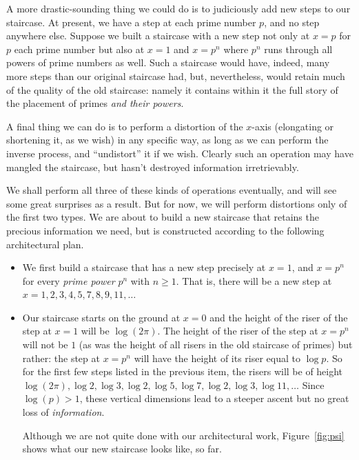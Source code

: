 \documentclass[openany]{book}
\theoremstyle{plain}
\theoremstyle{definition}
\begin{document}
{A more drastic-sounding thing we could do is to judiciously add new
steps to our staircase. At present, we have a step at each prime
number $p$, and no step anywhere else. Suppose we built a staircase
with a new step not only at $x=p$ for $p$ each prime number but also at
$x =1$ and $x=p^n$ where $p^n$ runs through all powers of prime numbers as
well. Such a staircase would have, indeed, many more steps than our
original staircase had, but, nevertheless, would retain much of the
quality of the old staircase: namely it contains within it the full
story of the placement of primes {\em and their powers}.

A final thing we can do is to perform a distortion of the $x$-axis
(elongating or shortening it, as we wish) in any specific way, as long
as we can perform the inverse process, and ``undistort'' it if we wish.
Clearly such an operation may have mangled the staircase, but hasn't destroyed
information irretrievably.

We shall perform all three of these kinds of operations eventually,
and will see some great surprises as a result.  But for now, we will
perform distortions only of the first two types.  We are about to
build a new staircase that retains the precious information we need,
but is constructed according to the following architectural plan.

 \begin{itemize}

 \item We first build a staircase that has a new step precisely at $x
   =1$, and $ x= p^n$ for every {\em prime power} $p^n$ with $n\geq
   1$. That is, there will be a new step at $x= 1,2,3,4,5,7,8,9,11,
   \dots$

 \item Our staircase starts on the ground at $x=0$ and the height of the
   riser of the step at $x=1$ will be $\log(2\pi)$. The height of the
   riser of the step at $x=p^n$ will not be $1$
   (as was the height of all risers in the old staircase of primes)
   but rather: the step at $x=p^n$ will have the height of its riser
   equal to $\log p$.  So for the first few steps listed in the
   previous item, the risers will be of height $\log(2\pi), \log
   2,\log 3,\log 2,\log 5,\log 7, \log 2,\log 3,\log 11, \dots$
   Since $\log(p)>1$,
  these vertical dimensions lead to a steeper ascent but no great loss
  of {\em information}.

   Although we are not quite done with our architectural work, Figure~\ref{fig:psi} shows
   what our new staircase looks like, so far.


\end{itemize}}
\end{document}

